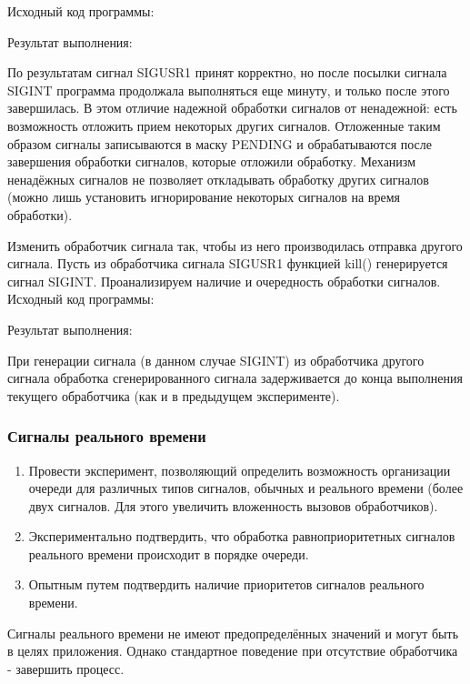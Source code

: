 \documentclass[a4paper]{article}
\begin{document}
	Исходный код программы:
	
	
	Результат выполнения:
	


	По результатам сигнал SIGUSR1 принят корректно, но после посылки сигнала SIGINT программа продолжала выполняться еще минуту, и только после этого завершилась. В этом отличие надежной обработки сигналов от ненадежной: есть возможность отложить прием некоторых других сигналов. Отложенные таким образом сигналы записываются в маску PENDING и обрабатываются после завершения обработки сигналов, которые отложили обработку. Механизм ненадёжных сигналов не позволяет откладывать обработку других сигналов (можно лишь установить игнорирование некоторых сигналов на время обработки).
	
	Изменить обработчик сигнала так, чтобы из него производилась отправка другого сигнала. Пусть из обработчика сигнала SIGUSR1 функцией kill() генерируется сигнал SIGINT. Проанализируем наличие и очередность обработки сигналов.	
	Исходный код программы:
	
	
	Результат выполнения:
	
	
	При генерации сигнала (в данном случае SIGINT) из обработчика другого сигнала обработка сгенерированного сигнала задерживается до конца выполнения текущего обработчика (как и в предыдущем эксперименте).

	\subsubsection{Сигналы реального времени}
	\begin{enumerate}
	\item Провести эксперимент, позволяющий определить возможность организации очереди для различных типов сигналов, обычных и реального времени (более двух сигналов. Для этого увеличить вложенность вызовов обработчиков).
	\item Экспериментально подтвердить, что обработка равноприоритетных сигналов реального времени происходит в порядке очереди.
	\item Опытным путем подтвердить наличие приоритетов сигналов реального времени.
	\end{enumerate}
	Сигналы реального времени не имеют предопределённых значений и могут быть в целях приложения. Однако стандартное поведение при отсутствие обработчика - завершить процесс.
	
\end{document}
